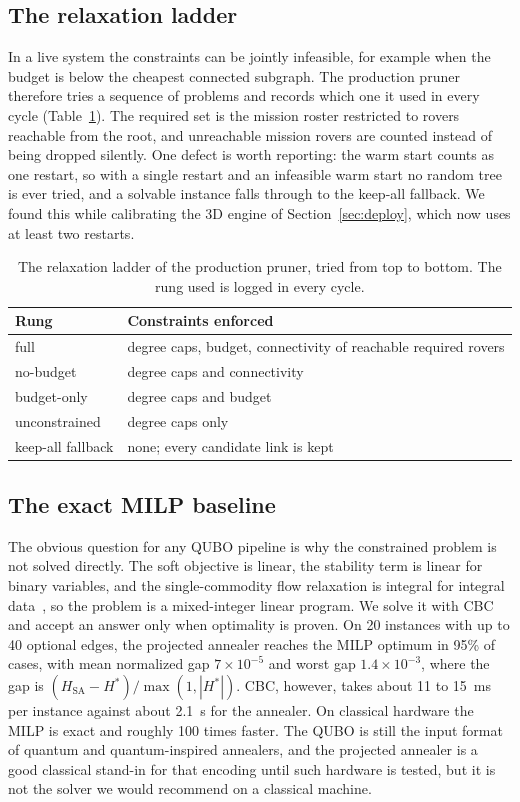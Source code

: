 \documentclass[11pt]{article}
\begin{document}
\subsection{The relaxation ladder}
\label{sec:ladder}

In a live system the constraints can be jointly infeasible, for example when
the budget is below the cheapest connected subgraph. The production pruner
therefore tries a sequence of problems and records which one it used in every
cycle (Table~\ref{tab:ladder}). The required set is the mission roster
restricted to rovers reachable from the root, and unreachable mission rovers
are counted instead of being dropped silently. One defect is worth reporting:
the warm start counts as one restart, so with a single restart and an
infeasible warm start no random tree is ever tried, and a solvable instance
falls through to the keep-all fallback. We found this while calibrating the 3D
engine of Section~\ref{sec:deploy}, which now uses at least two restarts.

\begin{table}[t]
\centering
\caption{The relaxation ladder of the production pruner, tried from top to
bottom. The rung used is logged in every cycle.}
\label{tab:ladder}
\small
\begin{tabular}{@{}ll@{}}
\toprule
Rung & Constraints enforced \\
\midrule
full & degree caps, budget, connectivity of reachable required rovers \\
no-budget & degree caps and connectivity \\
budget-only & degree caps and budget \\
unconstrained & degree caps only \\
keep-all fallback & none; every candidate link is kept \\
\bottomrule
\end{tabular}
\end{table}

\subsection{The exact MILP baseline}

The obvious question for any QUBO pipeline is why the constrained problem is
not solved directly. The soft objective is linear, the stability term is
linear for binary variables, and the single-commodity flow relaxation is
integral for integral data~\cite{ahuja1993}, so the problem is a
mixed-integer linear program. We solve it with CBC and accept an answer only
when optimality is proven. On 20 instances with up to 40 optional edges, the
projected annealer reaches the MILP optimum in 95\% of cases, with mean
normalized gap $7\times10^{-5}$ and worst gap $1.4\times10^{-3}$, where the gap
is $(H_{\mathrm{SA}}-H^{*})/\max(1,|H^{*}|)$. CBC, however, takes about 11 to
15~ms per instance against about 2.1~s for the annealer. On classical
hardware the MILP is exact and roughly 100 times faster. The QUBO is still
the input format of quantum and quantum-inspired annealers, and the projected
annealer is a good classical stand-in for that encoding until such hardware is
tested, but it is not the solver we would recommend on a classical machine.
\end{document}
